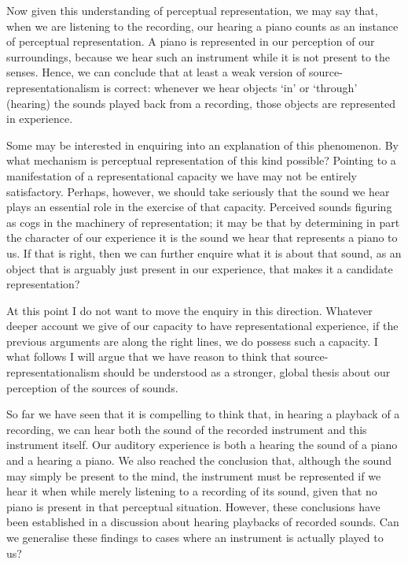 \documentclass[sloppy, journal, git, bytitle, dodraft]{humapap}
\begin{document}
Now given this understanding of perceptual representation, we may say that, when we are listening to the recording, our hearing a piano counts as an instance of perceptual representation. A piano is represented in our perception of our surroundings, because we hear such an instrument while it is not present to the senses. Hence, we can conclude that at least a weak version of source-representationalism is correct: whenever we hear objects `in' or `through' (hearing) the sounds played back from a recording, those objects are  represented in experience. %

Some may be interested in enquiring into an explanation of this phenomenon. By what mechanism is perceptual representation of this kind possible? Pointing to a manifestation of a representational capacity we have may not be entirely satisfactory. Perhaps, however, we should take seriously that the sound we hear plays an essential role in the exercise of that capacity. Perceived sounds figuring as cogs in the machinery of representation; it may be that by determining in part the character of our experience it is the sound we hear that represents a piano to us. If that is right, then we can further enquire what it is about that sound, as an object that is arguably just present in our experience, that makes it a candidate representation? 

At this point I do not want to move the enquiry in this direction. Whatever deeper account we give of our capacity to have representational experience, if the previous arguments are along the right lines, we do possess such a capacity. I what follows I will argue that we have reason to think that source-representationalism should be understood as a stronger, global thesis about our perception of the sources of sounds. 


\sect So far we have seen that it is compelling to think that, in hearing a playback of a recording, we can hear both the sound of the recorded instrument and this instrument itself. Our auditory experience is both a hearing the sound of a piano and a hearing a piano. We also reached the conclusion that, although the sound may simply be present to the mind, the instrument must be represented if we hear it when while merely listening to a recording of its sound, given that no piano is present in that perceptual situation. However, these conclusions have been established in a discussion about hearing playbacks of recorded sounds. Can we generalise these findings to cases where an instrument is actually played to us? 
\end{document}
